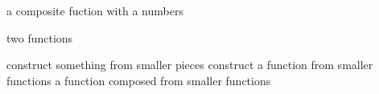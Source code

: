 \documentclass[fleqn,letterpaper,12pt,printwatermark=true]{memoir}
\begin{document}
\newcommand{\myClassName}{Pre-AP Algebra 2}
\newcommand{\myUnitNumber}{1}
\newcommand{\myUnitTitle}{Introduction to Functions}
\newcommand{\myLessonNumber}{8}
\newcommand{\myLessonTitle}{Composing Functions}



\pagestyle{myPagestyle}

\checkandfixthelayout
{}

\begin{myNotesHeader}
    \item {} a composite fuction with a numbers
    \item {} two functions
\end{myNotesHeader}

\begin{myVocabulary}
        {
            construct something from smaller pieces
        }
        {
            construct a function from smaller functions
        }
        {
            a function composed from smaller functions
        }
\end{myVocabulary}
\end{document}
